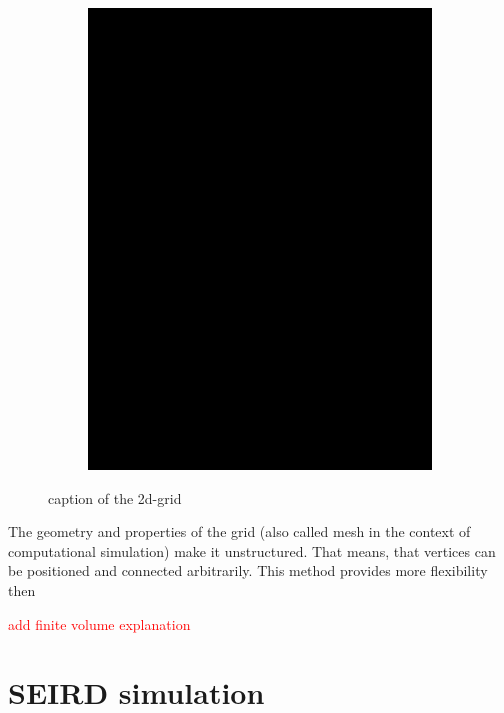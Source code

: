 \begin{figure}
\begin{center}
\begin{subfigure}[b]{0.3\textwidth}
			\includegraphics[width=\textwidth]{./figures/2d_grid_test.png}
		\end{subfigure}
	\end{center}
	\caption{caption of the 2d-grid}
	\label{fig:2d-grid}
\end{figure}

The geometry and properties of the grid (also called mesh in the context of computational simulation) make it unstructured.
That means, that vertices can be positioned and connected arbitrarily. This method provides more flexibility then 

\textcolor{red}{add finite volume explanation}


\section{SEIRD simulation}

